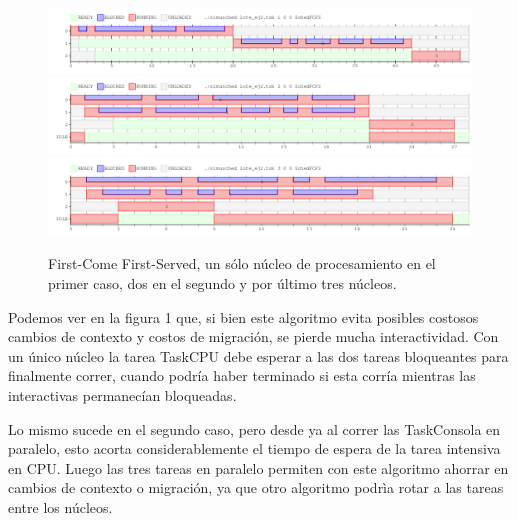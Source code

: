 \begin{figure}[H]
\centering\includegraphics[width=18 cm]{graficos/ej2FCFS1.png}
\centering\includegraphics[width=18 cm]{graficos/ej2FCFS2.png}
\centering\includegraphics[width=18 cm]{graficos/ej2FCFS3.png}
\caption{First-Come First-Served, un sólo núcleo de procesamiento en el primer caso, dos en el segundo y por último tres núcleos.}
\end{figure}

Podemos ver en la figura 1 que, si bien este algoritmo evita posibles costosos cambios de contexto y costos de migración, se pierde mucha interactividad. Con un único núcleo la tarea TaskCPU debe esperar a las dos tareas bloqueantes para finalmente correr, cuando podría haber terminado si esta corría mientras las interactivas permanecían bloqueadas.

Lo mismo sucede en el segundo caso, pero desde ya al correr las TaskConsola en paralelo, esto acorta considerablemente el tiempo de espera de la tarea intensiva en CPU. Luego las tres tareas en paralelo permiten con este algoritmo ahorrar en cambios de contexto o migración, ya que otro algoritmo podrìa rotar a las tareas entre los núcleos.



